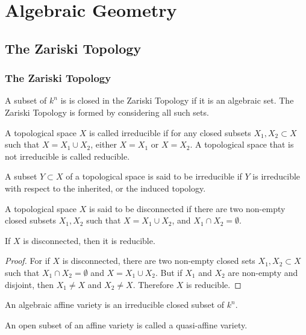 \documentclass[crop=false,class=article,oneside]{standalone}
\begin{document}
    \ifx\ifgeoalg\undefined
        \section*{Algebraic Geometry}
        \setcounter{section}{1}
    \fi
\subsection{The Zariski Topology}
    \subsubsection{The Zariski Topology}
    \begin{definition}
    A subset of $k^n$ is is closed in the Zariski Topology if it is an algebraic set. The Zariski Topology is formed by considering all such sets.
    \end{definition}
    \begin{definition}
    A topological space $X$ is called irreducible if for any closed subsets $X_1,X_2\subset X$ such that $X=X_1\cup X_2$, either $X=X_1$ or $X=X_2$. A topological space that is not irreducible is called reducible.
    \end{definition}
    \begin{definition}
    A subset $Y\subset X$ of a topological space is said to be irreducible if $Y$ is irreducible with respect to the inherited, or the induced topology.
    \end{definition}
    \begin{definition}
    A topological space $X$ is said to be disconnected if there are two non-empty closed subsets $X_1,X_2$ such that $X = X_1\cup X_2$, and $X_1\cap X_2 = \emptyset$.
    \end{definition}
    \begin{theorem}
    If $X$ is disconnected, then it is reducible.
    \end{theorem}
    \begin{proof}
    For if $X$ is disconnected, there are two non-empty closed sets $X_1,X_2\subset X$ such that $X_1\cap X_2 = \emptyset$ and $X = X_1\cup X_2$. But if $X_1$ and $X_2$ are non-empty and disjoint, then $X_1\ne X$ and $X_2 \ne X$. Therefore $X$ is reducible.
    \end{proof}
    \begin{definition}
    An algebraic affine variety is an irreducible closed subset of $k^n$.
    \end{definition}
    \begin{definition}
    An open subset of an affine variety is called a quasi-affine variety.
    \end{definition}
\end{document}
